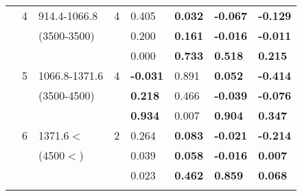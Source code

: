 \begin{table}[p]
\begin{tabular}{ccccllll}
 \multicolumn{1}{c}{} &  \multicolumn{1}{c}{4} &  \multicolumn{1}{l}{914.4-1066.8} &  \multicolumn{1}{c}{4} & 0.405 & \textbf{0.032 } & \textbf{-0.067 } & \textbf{-0.129 }  \\ 
  \multicolumn{1}{c}{} &  \multicolumn{1}{c}{} &  \multicolumn{1}{l}{(3500-3500)} &  \multicolumn{1}{c}{} & 0.200 & \textbf{0.161 } & \textbf{-0.016 } & \textbf{-0.011 }  \\ 
 \multicolumn{1}{c}{} &  \multicolumn{1}{c}{} &  \multicolumn{1}{c}{} &  \multicolumn{1}{c}{} & 0.000 & \textbf{0.733 } & \textbf{0.518 } & \textbf{0.215 }  \\ \cline{5-8}\noalign{\smallskip}
 \multicolumn{1}{c}{} &  \multicolumn{1}{c}{5} &  \multicolumn{1}{l}{1066.8-1371.6} &  \multicolumn{1}{c}{4} & \textbf{-0.031} & 0.891  & \textbf{0.052 } & \textbf{-0.414 }  \\ 
 \multicolumn{1}{c}{} &  \multicolumn{1}{c}{} &  \multicolumn{1}{l}{(3500-4500)} &  \multicolumn{1}{c}{} &\textbf{0.218}& 0.466  & \textbf{-0.039 } & \textbf{-0.076 }  \\ 
 \multicolumn{1}{c}{} &  \multicolumn{1}{c}{} &  \multicolumn{1}{c}{} &  \multicolumn{1}{c}{} &\textbf{0.934}& 0.007  & \textbf{0.904 } & \textbf{0.347 }  \\ \cline{5-8}\noalign{\smallskip}
  \multicolumn{1}{c}{} &  \multicolumn{1}{c}{6} &  \multicolumn{1}{l}{1371.6$<$} &  \multicolumn{1}{c}{2} &0.264& \textbf{0.083 } & \textbf{-0.021 } & \textbf{-0.214 }  \\ 
 \multicolumn{1}{c}{} &  \multicolumn{1}{c}{} &  \multicolumn{1}{l}{(4500$<$)} &  \multicolumn{1}{c}{} &0.039&  \textbf{0.058 } & \textbf{-0.016 } & \textbf{0.007 }  \\ 
 \multicolumn{1}{c}{} &  \multicolumn{1}{c}{} &  \multicolumn{1}{c}{} &  \multicolumn{1}{c}{} &0.023&  \textbf{0.462 } & \textbf{0.859 } & \textbf{0.068 }  \\  \hline\noalign{\smallskip}
\end{tabular}
\label{app:time vars}
\end{table}

